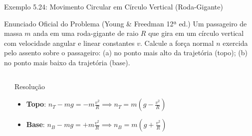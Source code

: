 \documentclass[10pt,aspectratio=169]{beamer}
\begin{document}
\begin{frame}{Exemplo 5.24: Movimento Circular em Círculo Vertical (Roda-Gigante)}
    \begin{block}{Enunciado Oficial do Problema (Young \& Freedman 12ª ed.)}
        \small
        Um passageiro de massa $m$ anda em uma roda-gigante de raio $R$ que gira em um círculo vertical com velocidade angular e linear constantes $v$. Calcule a força normal $n$ exercida pelo assento sobre o passageiro: (a) no ponto mais alto da trajetória (topo); (b) no ponto mais baixo da trajetória (base).
    \end{block}
    \begin{columns}[T]
        \begin{center}
        \end{center}
        \begin{exampleblock}{Resolução}
            \small
            \begin{itemize}\setlength{\itemsep}{3pt}
                \item \textbf{Topo}: $n_T - mg = -m \frac{v^2}{R} \implies n_T = m\left(g - \frac{v^2}{R}\right)$
                \item \textbf{Base}: $n_B - mg = +m \frac{v^2}{R} \implies n_B = m\left(g + \frac{v^2}{R}\right)$
            \end{itemize}
        \end{exampleblock}
    \end{columns}
\end{frame}
\end{document}
